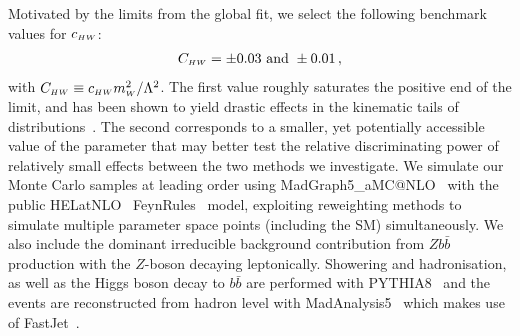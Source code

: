 Motivated by the limits from the global fit, we select the following benchmark values for $c_{\scriptscriptstyle HW}$:
\begin{align}
    C_{\scriptscriptstyle HW} = \pm 0.03 \text{ and } \pm0.01\,,
\end{align}
with $ C_{\scriptscriptstyle HW}\equiv c_{\scriptscriptstyle HW} m_{\scriptscriptstyle W}^2/\Lambda^2$. The first value roughly saturates the positive end of the limit, and has been shown to yield drastic effects in the kinematic tails of distributions~\cite{Degrande:2016dqg}. The second corresponds to a smaller, yet potentially accessible value of the parameter that may better test the relative discriminating power of relatively small effects between the two methods we investigate. We simulate our Monte Carlo samples at leading order using {\sc MadGraph5\_aMC@NLO}~\cite{Alwall:2014hca} with the public {\sc HELatNLO}~\cite{Degrande:2016dqg,Alloul:2013naa} {\sc FeynRules}~\cite{Alloul:2013bka} model, exploiting reweighting methods to simulate multiple parameter space points (including the SM) simultaneously. We also include the dominant irreducible background contribution from $Z b\bar{b}$ production with the $Z$-boson decaying leptonically. Showering and hadronisation, as well as the Higgs boson decay to $b\bar{b}$ are performed with {\sc PYTHIA8}~\cite{pythia8} and the events are reconstructed from hadron level with {\sc MadAnalysis5}~\cite{Conte:2012fm} which makes use of {\sc FastJet}~\cite{Cacciari:2011ma}.


